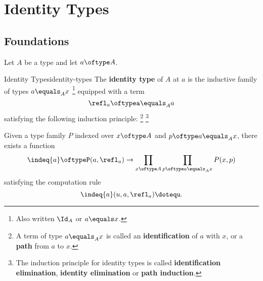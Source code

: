 \section{Identity Types}\label{section-martin-löf-type-theory-identity-types}
\subsection{Foundations}\label{subsection-martin-löf-type-theory-identity-types-foundations}
Let $A$ be a type and let $a\oftype A$.
\begin{definition}{Identity Types}{identity-types}%
    The \textbf{identity type} of $A$ at $a$ is the inductive family of types $a\equals_{A}x$%
    \footnote{%
        Also written $\Id_{A}$ or $a\equals x$.%
    } %
    equipped with a term
    \[
        \refl_{a}%
        \oftype%
        a\equals_{A}a%
    \]%
    satisfying the following induction principle:%
    \footnote{%
        A term of type $a\equals_{A}x$ is called an \textbf{identification} of $a$ with $x$, or a \textbf{path} from $a$ to $x$.
    }%
    \footnote{%
        The induction principle for identity types is called \textbf{identification elimination}, \textbf{identity elimination} or \textbf{path induction}.
        \par\vspace*{\TCBBoxCorrection}
    }%
    \begin{itemize}
        \itemstar Given a type family $P$ indexed over $x\oftype A$ and $p\oftype a\equals_{A}x$, there exists a function
            \[
                \indeq{a}%
                \oftype%
                P(a,\refl_{a})%
                \to%
                \prod_{x\oftype A}\prod_{p\oftype a\equals_{A}x}P(x,p)%
            \]%
            satisfying the computation rule
            \[
                \indeq{a}(u,a,\refl_{a})%
                \doteq%
                u.%
            \]%
    \end{itemize}
\end{definition}
